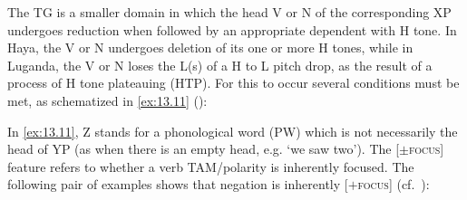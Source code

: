\documentclass[output=paper]{langsci/langscibook}
\begin{document}
The \gls{TG} is a smaller domain in which the head V or N of the corresponding
XP undergoes reduction when followed by an appropriate dependent with H tone.
In Haya, the V or N undergoes deletion of its one or more H tones, while in
Luganda, the V or N loses the L(s) of a H to L pitch drop, as the result of a
process of H tone plateauing (\gls{HTP}). For this to occur
several conditions must be met, as schematized in \eqref{ex:13.11}
(\citealt[75]{HymanKatamba2010}):

\begin{exe}
    \ex\label{ex:13.11} 
\end{exe}
In \eqref{ex:13.11}, Z stands for a phonological word (\gls{PW})
which is not necessarily the head of YP (as when there is an empty head, e.g.
‘we saw two’).  The [$\pm$\textsc{focus}] feature refers to whether a verb
\gls{TAM}/polarity is inherently focus\-ed. The following pair of examples shows
that negation is inherently [$+$\textsc{focus}] (cf.\ \citealt{HymanWatters1984}):
\end{document}
